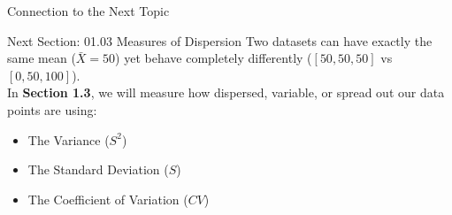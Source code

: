 \documentclass[aspectratio=169,xcolor={dvipsnames,table}]{beamer}
\begin{document}
\begin{frame}{Connection to the Next Topic}
  \begin{alertblock}{Next Section: 01.03 Measures of Dispersion}
    Two datasets can have exactly the same mean ($\bar{X} = 50$) yet behave completely differently ($[50, 50, 50]$ vs $[0, 50, 100]$).
    \vspace{0.6em}
    \\ In \textbf{Section 1.3}, we will measure how dispersed, variable, or spread out our data points are using:
    \begin{itemize}
      \item The Variance ($S^2$)
      \item The Standard Deviation ($S$)
      \item The Coefficient of Variation ($CV$)
    \end{itemize}
  \end{alertblock}
\end{frame}
\end{document}
